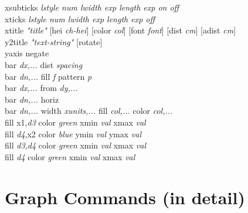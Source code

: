{\sf xsubticks {\it {\sf lstyle} num  {\sf lwidth} exp {\sf length} exp {\sf on} {\sf off}}} \\
{\sf xticks {\it {\sf lstyle} num {\sf lwidth} exp {\sf length} exp {\sf off}}} \\
{\sf xtitle {\it "title"} [hei {\it ch-hei}] [color {\it col}] [font {\it font}] [dist {\it cm}] [adist {\it cm}]}   \\
{\sf y2title {\it "text-string"}  [rotate]  }  \\
{\sf yaxis negate}  \\
{\sf bar {\it dx,...} dist {\it spacing}}\\
{\sf bar {\it dn,...} fill {\it f} pattern {\it p}} \\
{\sf bar {\it dx,...} from {\it dy,...}}\\
{\sf bar {\it dn,...} horiz} \\
{\sf bar {\it dn,...} width {\it xunits,...} fill {\it col,...} color {\it col,...} }\\
{\sf fill x1,{\it d3} color {\it green}  xmin {\it val} xmax {\it val}} \\
{\sf fill {\it d4},x2 color {\it blue}   ymin {\it val} ymax {\it val}} \\
{\sf fill {\it d3,d4} color {\it green}  xmin {\it val} xmax {\it val}} \\
{\sf fill {\it d4} color {\it green}  xmin {\it val} xmax {\it val}} \\


\section{Graph Commands (in detail)}

